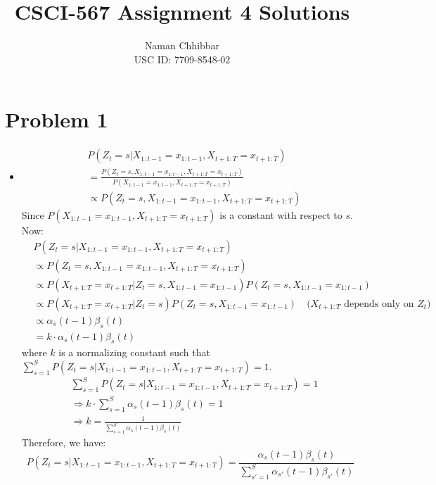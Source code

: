 \documentclass{article}
\title{CSCI-567 Assignment 4 Solutions}
\author{
  Naman Chhibbar \\
  USC ID: 7709-8548-02
}
\date{}
\begin{document}
\maketitle

\section{Problem 1}
  \begin{itemize}
    \item[\textbf{1.1}]
    \begin{align*}
      &P(Z_t = s | X_{1:t-1} = x_{1:t-1}, X_{t+1:T} = x_{t+1:T}) \\
      &= \frac{P(Z_t = s, X_{1:t-1} = x_{1:t-1}, X_{t+1:T} = x_{t+1:T})}{P(X_{1:t-1} = x_{1:t-1}, X_{t+1:T} = x_{t+1:T})} \\
      &\propto P(Z_t = s, X_{1:t-1} = x_{1:t-1}, X_{t+1:T} = x_{t+1:T})
    \end{align*}
    Since $P(X_{1:t-1} = x_{1:t-1}, X_{t+1:T} = x_{t+1:T})$ is a constant with respect to $s$.
    Now:
    \begin{align*}
      &P(Z_t = s | X_{1:t-1} = x_{1:t-1}, X_{t+1:T} = x_{t+1:T}) \\
      &\propto P(Z_t = s, X_{1:t-1} = x_{1:t-1}, X_{t+1:T} = x_{t+1:T}) \\
      &\propto P(X_{t+1:T} = x_{t+1:T} | Z_t = s, X_{1:t-1} = x_{1:t-1}) P(Z_t = s, X_{1:t-1} = x_{1:t-1}) \\
      &\propto P(X_{t+1:T} = x_{t+1:T} | Z_t = s) P(Z_t = s, X_{1:t-1} = x_{1:t-1}) \quad \text{($X_{t+1:T}$ depends only on $Z_t$)} \\
      &\propto \alpha_s(t-1) \beta_s(t) \\
      &= k \cdot \alpha_s(t-1) \beta_s(t)
    \end{align*}
    where $k$ is a normalizing constant such that $\sum_{s=1}^{S} P(Z_t = s | X_{1:t-1} = x_{1:t-1}, X_{t+1:T} = x_{t+1:T}) = 1$.
    \begin{align*}
      &\sum_{s=1}^{S} P(Z_t = s | X_{1:t-1} = x_{1:t-1}, X_{t+1:T} = x_{t+1:T}) = 1 \\
      &\Rightarrow k \cdot \sum_{s=1}^{S} \alpha_s(t-1) \beta_s(t) = 1 \\
      &\Rightarrow k = \frac{1}{\sum_{s=1}^{S} \alpha_s(t-1) \beta_s(t)}
    \end{align*}
    Therefore, we have:
    \[ P(Z_t = s | X_{1:t-1} = x_{1:t-1}, X_{t+1:T} = x_{t+1:T}) = \frac{\alpha_s(t-1) \beta_s(t)}{\sum_{s'=1}^{S} \alpha_{s'}(t-1) \beta_{s'}(t)} \]


\end{itemize}
\end{document}

